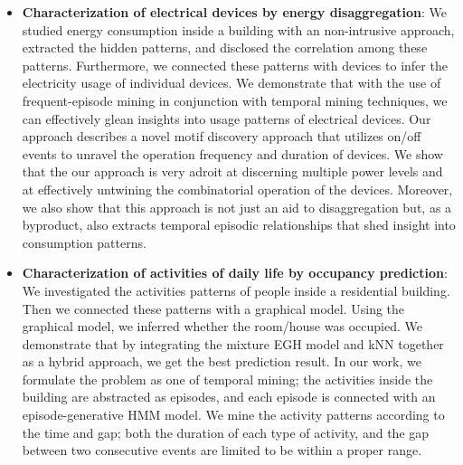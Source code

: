 \begin{itemize}
\item \textbf{Characterization of electrical devices by energy disaggregation}: We studied energy consumption inside a building with an non-intrusive approach,  extracted the hidden patterns, and disclosed the correlation among these patterns. Furthermore, we connected these patterns with devices to infer the electricity usage of individual devices. 
We demonstrate that with the use of frequent-episode mining in conjunction with temporal mining techniques, we can effectively glean insights into usage patterns of electrical devices. Our approach describes a novel motif discovery approach that utilizes on/off events to unravel the operation frequency and duration of devices. We show that the our approach is very adroit at discerning multiple power levels and at effectively untwining the combinatorial operation of the devices. Moreover, we also show that this approach is not just an aid to disaggregation but, as a byproduct, also extracts temporal episodic relationships that shed insight into consumption patterns.


\item \textbf{Characterization of activities of daily life by occupancy prediction}: We investigated the activities patterns of people inside a residential building. Then we connected these patterns with a graphical model. Using the graphical model, we inferred whether the room/house was occupied. 
We demonstrate that by integrating the mixture EGH model and 
kNN together as a hybrid approach, we get the best prediction result. In our work, we formulate the problem as one of temporal mining; the activities inside the building are abstracted as episodes, and each episode is connected with an episode-generative HMM model. We mine the activity patterns according to the time and gap; both the duration of each type of activity, and the gap between two consecutive events are limited to be within a proper range. 
\end{itemize}

